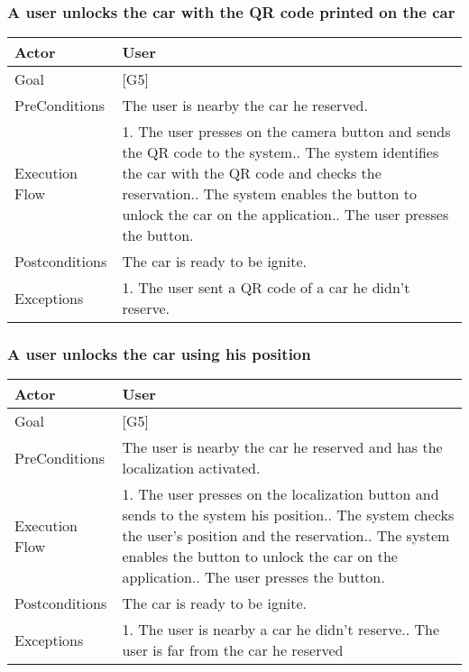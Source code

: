 \documentclass{article}
\begin{document}
	\subsubsection{A user unlocks the car with the QR code printed on the car}
	\begin{tabularx}{\textwidth}{  l  X  }
		\hline
		Actor & User\\
		\hline
		Goal & [G5]\\
		\hline
		PreConditions & The user is nearby the car he reserved.\\
		\hline
		Execution Flow & 1. The user presses on the camera button and sends the QR code to the system.\newline
										 2. The system identifies the car with the QR code and checks the reservation.\newline
										 3. The system enables the button to unlock the car on the application.\newline
										 4. The user presses the button.\\
		\hline
		Postconditions & The car is ready to be ignite.\\
		\hline
		Exceptions & 1. The user sent a QR code of a car he didn't reserve.\\
		\hline
	\end{tabularx}

	\subsubsection{A user unlocks the car using his position}
	\begin{tabularx}{\textwidth}{  l  X  }
		\hline
		Actor & User\\
		\hline
		Goal & [G5]\\
		\hline
		PreConditions & The user is nearby the car he reserved and has the localization activated.\\
		\hline
		Execution Flow & 1. The user presses on the localization button and sends to the system his position.\newline
										 2. The system checks the user's position and the reservation.\newline
										 3. The system enables the button to unlock the car on the application.\newline
										 4. The user presses the button.\\
		\hline
		Postconditions & The car is ready to be ignite.\\
		\hline
		Exceptions & 1. The user is nearby a car he didn't reserve.\newline
								 2. The user is far from the car he reserved\newline\\
		\hline
	\end{tabularx}
\end{document}
